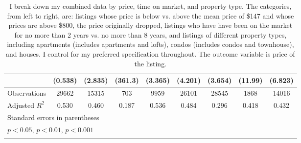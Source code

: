 {\begin{longtable}{l*{8}{c}}
                    &     (0.538)         &     (2.835)         &     (361.3)         &     (3.365)         &     (4.201)         &     (3.654)         &     (11.99)         &     (6.823)         \\
\hline
Observations        &       29662         &       15315         &         703         &        9959         &       26101         &       28545         &        1868         &       14016         \\
Adjusted \(R^{2}\)  &       0.530         &       0.460         &       0.187         &       0.536         &       0.484         &       0.296         &       0.418         &       0.432         \\
\hline\hline
\multicolumn{9}{l}{\footnotesize Standard errors in parentheses}\\
\multicolumn{9}{l}{\footnotesize \sym{*} \(p<0.05\), \sym{**} \(p<0.01\), \sym{***} \(p<0.001\)}\\
\caption {I break down my combined data by price, time on market, and property type. The categories, from left to right, are: listings whose price is below vs. above the mean price of \$147 and whose prices are above \$800, the price originally dropped, listings who have have been on the market for no more than 2 years vs. no more than 8 years, and listings of different property types, including apartments (includes apartments and lofts), condos (includes condos and townhouse), and houses. I control for my preferred specification throughout. The outcome variable is price of the listing.}

\end{longtable}
}


